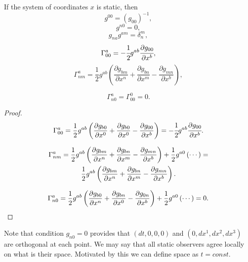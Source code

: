 \documentclass[main.tex]{subfiles}
\begin{document}
\begin{fact}
If the system of coordinates $x$ is static, then
\begin{equation}
g^{00} = (g_{00})^{-1},
\end{equation}
\begin{equation}
g^{n0} = 0,
\end{equation}
\begin{equation}
g_{na}g^{am} = \delta^m_n,
\end{equation} 
\begin{equation}
\Gamma^a_{00} = - \cfrac{1}{2} g^{ab}\cfrac{\partial g_{00}}{\partial x^b},
\end{equation}
\begin{equation}
\Gamma^a_{nm} = \frac{1}{2} g^{ab} \left( \frac{\partial g_{bm}}{\partial x^n} + \frac{\partial g_{bn}}{\partial x^m} - \frac{\partial g_{mn}}{\partial x^b} \right),
\end{equation}

\begin{equation}
\Gamma^a_{n0} = \Gamma^0_{00} = 0.
\end{equation}
\begin{proof}
$$\Gamma^a_{00} = {1 \over 2} g^{ab} \left( {\partial g_{b0} \over \partial x^0} + {\partial g_{b0} \over \partial x^0} - {\partial g_{00} \over \partial x^b} \right) = - \cfrac{1}{2} g^{ab}\cfrac{\partial g_{00}}{\partial x^b}.$$

\begin{gather*}
\Gamma^a_{nm} = {1 \over 2} g^{ab} \left( {\partial g_{bm} \over \partial x^n} + {\partial g_{bn} \over \partial x^m} - {\partial g_{mn} \over \partial x^b}\right) + {1 \over 2} g^{a0} \left( \cdots \right)  = \\
{1 \over 2} g^{ab} \left( {\partial g_{bm} \over \partial x^n} + {\partial g_{bn} \over \partial x^m} - {\partial g_{mn} \over \partial x^b}\right).
\end{gather*}

$$
\Gamma^a_{n0} = {1 \over 2} g^{ab} \left( {\partial g_{b0} \over \partial x^n} + {\partial g_{bn} \over \partial x^0} - {\partial g_{0n} \over \partial x^b} \right) + {1 \over 2}g^{a0}\left(\cdots \right) = 0.
$$
\end{proof}

Note that condition $g_{n0} = 0$ provides that $(dt, 0, 0, 0)$ and $(0,dx^1, dx^2, dx^3)$ are orthogonal at each point. We may say that all static observers agree locally on what is their space. Motivated by this we can define space as $t = const$.

\end{fact}
\end{document}
